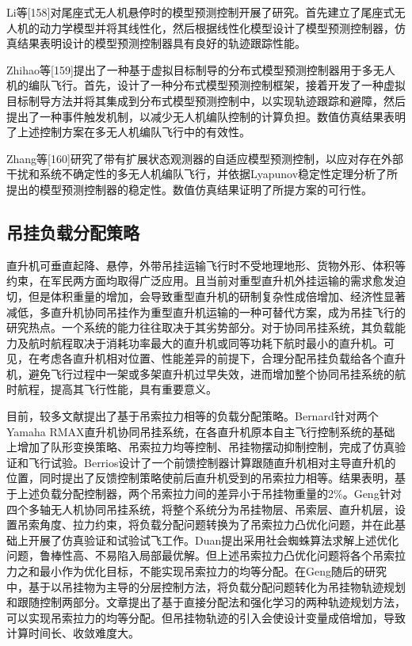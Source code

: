 Li等[158]对尾座式无人机悬停时的模型预测控制开展了研究。首先建立了尾座式无人机的动力学模型并将其线性化，然后根据线性化模型设计了模型预测控制器，仿真结果表明设计的模型预测控制器具有良好的轨迹跟踪性能。

Zhihao等[159]提出了一种基于虚拟目标制导的分布式模型预测控制器用于多无人机的编队飞行。首先，设计了一种分布式模型预测控制框架，接着开发了一种虚拟目标制导方法并将其集成到分布式模型预测控制中，以实现轨迹跟踪和避障，然后提出了一种事件触发机制，以减少无人机编队控制的计算负担。数值仿真结果表明了上述控制方案在多无人机编队飞行中的有效性。

Zhang等[160]研究了带有扩展状态观测器的自适应模型预测控制，以应对存在外部干扰和系统不确定性的多无人机编队飞行，并依据Lyapunov稳定性定理分析了所提出的模型预测控制器的稳定性。数值仿真结果证明了所提方案的可行性。


\subsection{吊挂负载分配策略}
直升机可垂直起降、悬停，外带吊挂运输飞行时不受地理地形、货物外形、体积等约束，在军民两方面均取得广泛应用\cite{ronen1985dynamics,cicolani1995simulation,bisgaard2008modeling,bisgaard2010adaptive}。且当前对重型直升机外挂运输的需求愈发迫切，但是体积重量的增加，会导致重型直升机的研制复杂性成倍增加、经济性显著减低，多直升机协同吊挂作为重型直升机运输的一种可替代方案，成为吊挂飞行的研究热点\cite{cicolani1992equations,raz2005trim,yi2018review}。一个系统的能力往往取决于其劣势部分。对于协同吊挂系统，其负载能力及航时航程取决于消耗功率最大的直升机或同等功耗下航时最小的直升机。可见，在考虑各直升机相对位置、性能差异的前提下，合理分配吊挂负载给各个直升机，避免飞行过程中一架或多架直升机过早失效，进而增加整个协同吊挂系统的航时航程，提高其飞行性能，具有重要意义。

目前，较多文献提出了基于吊索拉力相等的负载分配策略。Bernard\cite{bernard2013system}针对两个Yamaha RMAX直升机协同吊挂系统，在各直升机原本自主飞行控制系统的基础上增加了队形变换策略、吊索拉力均等控制、吊挂物摆动抑制控制，完成了仿真验证和飞行试验。Berrios\cite{berrios2018load}设计了一个前馈控制器计算跟随直升机相对主导直升机的位置，同时提出了反馈控制策略使前后直升机受到的吊索拉力相等。结果表明，基于上述负载分配控制器，两个吊索拉力间的差异小于吊挂物重量的2\%。Geng\cite{geng2019implementation,geng2020cooperative}针对四个多轴无人机协同吊挂系统，将整个系统分为吊挂物层、吊索层、直升机层，设置吊索角度、拉力约束，将负载分配问题转换为了吊索拉力凸优化问题，并在此基础上开展了仿真验证和试验试飞工作。Duan\cite{duan2021application}提出采用社会蜘蛛算法求解上述优化问题，鲁棒性高、不易陷入局部最优解。但上述吊索拉力凸优化问题将各个吊索拉力之和最小作为优化目标，不能实现吊索拉力的均等分配。在Geng随后的研究中\cite{geng2020control,geng2021trajectory}，基于以吊挂物为主导的分层控制方法，将负载分配问题转化为吊挂物轨迹规划和跟随控制两部分。文章提出了基于直接分配法和强化学习的两种轨迹规划方法，可以实现吊索拉力的均等分配。但吊挂物轨迹的引入会使设计变量成倍增加，导致计算时间长、收敛难度大。

